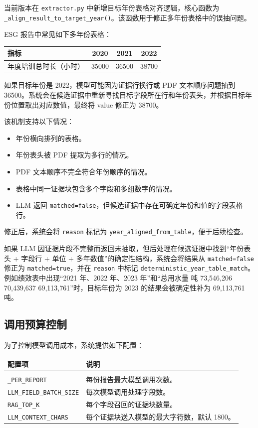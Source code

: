 \documentclass[UTF8,a4paper,12pt]{ctexart}
\newenvironment{manualtable}[1]{%
  \small
  \begin{longtable}{#1}
}{%
  \end{longtable}
  \normalsize
}
\begin{document}
当前版本在 \texttt{extractor.py} 中新增目标年份表格对齐逻辑，核心函数为 \texttt{\_align\_result\_to\_target\_year()}。该函数用于修正多年份表格中的误抽问题。

ESG 报告中常见如下多年份表格：

\begin{center}
\begin{tabular}{lccc}
\toprule
指标 & 2020 & 2021 & 2022 \\
\midrule
年度培训总时长（小时） & 35000 & 36500 & 38700 \\
\bottomrule
\end{tabular}
\end{center}

如果目标年份是 2022，模型可能因为证据行换行或 PDF 文本顺序问题抽到 36500。系统会在候选证据中重新寻找目标字段所在行和年份表头，并根据目标年份位置取出对应数值，最终将 value 修正为 38700。

该机制支持以下情况：

\begin{itemize}
  \item 年份横向排列的表格。
  \item 年份表头被 PDF 提取为多行的情况。
  \item PDF 文本顺序不完全符合年份顺序的情况。
  \item 表格中同一证据块包含多个字段和多组数字的情况。
  \item LLM 返回 \texttt{matched=false}，但候选证据中存在可确定年份和值的字段表格行。
\end{itemize}

修正后，系统会将 \texttt{reason} 标记为 \texttt{year\_aligned\_from\_table}，便于后续检查。

如果 LLM 因证据片段不完整而返回未抽取，但后处理在候选证据中找到“年份表头 + 字段行 + 单位 + 多年数值”的确定性结构，系统会将结果从 \texttt{matched=false} 修正为 \texttt{matched=true}，并在 \texttt{reason} 中标记 \texttt{deterministic\_year\_table\_match}。例如绩效表中出现“2021 年、2022 年、2023 年”和“总用水量 吨 73,546,206 70,439,637 69,113,761”时，目标年份为 2023 的结果会被确定性补为 69,113,761 吨。

\subsection{调用预算控制}

为了控制模型调用成本，系统提供如下配置：

\begin{manualtable}{p{5cm}p{9cm}}
\toprule
\textbf{配置项} & \textbf{说明} \\
\midrule
\endhead
\makecell[l]{\texttt{LLM\_MAX\_CALLS}\\\texttt{\_PER\_REPORT}} & 每份报告最大模型调用次数。 \\
\texttt{LLM\_FIELD\_BATCH\_SIZE} & 每次模型调用处理字段数。 \\
\texttt{RAG\_TOP\_K} & 每个字段召回的证据块数量。 \\
\texttt{LLM\_CONTEXT\_CHARS} & 每个证据块送入模型的最大字符数，默认 1800。 \\
\bottomrule
\end{manualtable}
\end{document}
